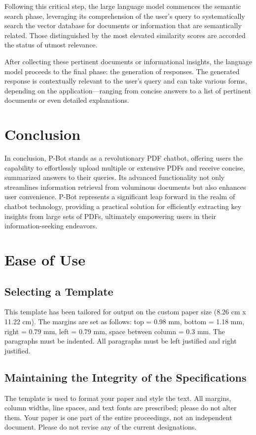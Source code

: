 \documentclass[fleqn,10pt]{thescipub} %
\begin{document}
Following this critical step, the large language model commences the semantic search phase, leveraging its comprehension of the user's query to systematically search the vector database for documents or information that are semantically related. Those distinguished by the most elevated similarity scores are accorded the status of utmost relevance.

After collecting these pertinent documents or informational insights, the language model proceeds to the final phase: the generation of responses. The generated response is contextually relevant to the user's query and can take various forms, depending on the application—ranging from concise answers to a list of pertinent documents or even detailed explanations.



\section{Conclusion}
In conclusion, P-Bot stands as a revolutionary PDF chatbot, offering users the capability to effortlessly upload multiple or extensive PDFs and receive concise, summarized answers to their queries. Its advanced functionality not only streamlines information retrieval from voluminous documents but also enhances user convenience. P-Bot represents a significant leap forward in the realm of chatbot technology, providing a practical solution for efficiently extracting key insights from large sets of PDFs, ultimately empowering users in their information-seeking endeavors.

\section{Ease of Use}
\subsection{Selecting a Template}
This template has been tailored for output on the custom paper size (8.26 cm x 11.22 cm). The margins are set as follows: top = 0.98 mm, bottom = 1.18 mm, right = 0.79 mm, left = 0.79 mm, space between column = 0.3 mm. The paragraphs must be indented. All paragraphs must be left justified and right justified.

\subsection{Maintaining the Integrity of the Specifications} 
The template is used to format your paper and style the text. All margins, column widths, line spaces, and text fonts are prescribed; please do not alter them. Your paper is one part of the entire proceedings, not an independent document. Please do not revise any of the current designations.
\end{document}
